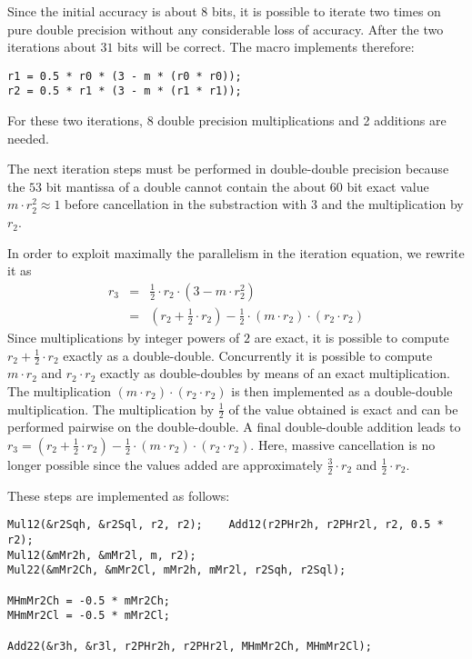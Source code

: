Since the initial accuracy is about $8$ bits, it is possible to iterate two times on pure double precision
without any considerable loss of accuracy. After the two iterations about $31$ bits will be correct.
The macro implements therefore:
\begin{lstlisting}[caption={Newton iteration - double precision steps},firstnumber=1]
r1 = 0.5 * r0 * (3 - m * (r0 * r0));
r2 = 0.5 * r1 * (3 - m * (r1 * r1));
\end{lstlisting}
For these two iterations, 8 double precision multiplications and 2 additions are needed.

The next iteration steps must be performed in double-double precision
because the $53$ bit mantissa of a double cannot contain the about
$60$ bit exact value $m \cdot r_2^2 \approx 1$ before cancellation in
the substraction with $3$ and the multiplication by $r_2$.

In order to exploit maximally the parallelism in the iteration equation, we rewrite it as
\begin{eqnarray*}
r_{3} & = & \frac{1}{2} \cdot r_2 \cdot \left( 3 - m \cdot r_2^2 \right) \\
& = & \left( r_2 + \frac{1}{2} \cdot r_2 \right) - \frac{1}{2} \cdot \left( m \cdot r_2 \right) \cdot
\left( r_2 \cdot r_2 \right)
\end{eqnarray*}
Since multiplications by integer powers of $2$ are exact, it is
possible to compute $r_2 + \frac{1}{2} \cdot r_2$ exactly as a
double-double. Concurrently it is possible to compute $m \cdot r_2$
and $r_2 \cdot r_2$ exactly as double-doubles by means of an exact
multiplication.  The multiplication $\left( m \cdot r_2 \right) \cdot
\left( r_2 \cdot r_2 \right)$ is then implemented as a double-double
multiplication.  The multiplication by $\frac{1}{2}$ of the value
obtained is exact and can be performed pairwise on the
double-double. A final double-double addition leads to $r_3 = \left(
r_2 + \frac{1}{2} \cdot r_2 \right) - \frac{1}{2} \cdot \left( m \cdot
r_2 \right) \cdot \left( r_2 \cdot r_2 \right)$. Here, massive
cancellation is no longer possible since the values added are
approximately $\frac{3}{2} \cdot r_2$ and $\frac{1}{2} \cdot r_2$.

These steps are implemented as follows:
\begin{lstlisting}[caption={Newton iteration - first double-double step},firstnumber=1]
Mul12(&r2Sqh, &r2Sql, r2, r2);    Add12(r2PHr2h, r2PHr2l, r2, 0.5 * r2);
Mul12(&mMr2h, &mMr2l, m, r2);
Mul22(&mMr2Ch, &mMr2Cl, mMr2h, mMr2l, r2Sqh, r2Sql);

MHmMr2Ch = -0.5 * mMr2Ch;
MHmMr2Cl = -0.5 * mMr2Cl;

Add22(&r3h, &r3l, r2PHr2h, r2PHr2l, MHmMr2Ch, MHmMr2Cl);
\end{lstlisting}

